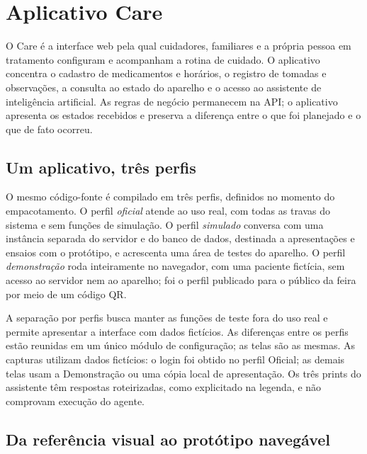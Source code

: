 \section{Aplicativo Care}\label{cap:aplicativo}
O Care é a interface web pela qual cuidadores, familiares e a própria pessoa em tratamento configuram e acompanham a rotina de cuidado. O aplicativo concentra o cadastro de medicamentos e horários, o registro de tomadas e observações, a consulta ao estado do aparelho e o acesso ao assistente de inteligência artificial. As regras de negócio permanecem na API; o aplicativo apresenta os estados recebidos e preserva a diferença entre o que foi planejado e o que de fato ocorreu. 

\subsection{Um aplicativo, três perfis}
O mesmo código-fonte é compilado em três perfis, definidos no momento do empacotamento. O perfil \emph{oficial} atende ao uso real, com todas as travas do sistema e sem funções de simulação. O perfil \emph{simulado} conversa com uma instância separada do servidor e do banco de dados, destinada a apresentações e ensaios com o protótipo, e acrescenta uma área de testes do aparelho. O perfil \emph{demonstração} roda inteiramente no navegador, com uma paciente fictícia, sem acesso ao servidor nem ao aparelho; foi o perfil publicado para o público da feira por meio de um código QR.

A separação por perfis busca manter as funções de teste fora do uso real e permite apresentar a interface com dados fictícios. As diferenças entre os perfis estão reunidas em um único módulo de configuração; as telas são as mesmas. As capturas utilizam dados fictícios: o login foi obtido no perfil Oficial; as demais telas usam a Demonstração ou uma cópia local de apresentação. Os três prints do assistente têm respostas roteirizadas, como explicitado na legenda, e não comprovam execução do agente. 

\subsection{Da referência visual ao protótipo navegável}


